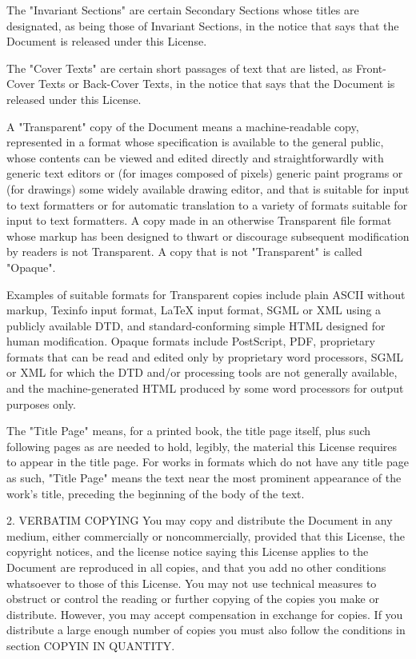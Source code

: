The "Invariant Sections" are certain Secondary Sections whose titles are designated, as being those of Invariant Sections, in the notice that says that the Document is released under this License.

The "Cover Texts" are certain short passages of text that are listed, as Front-Cover Texts or Back-Cover Texts, in the notice that says that the Document is released under this License.

A "Transparent" copy of the Document means a machine-readable copy, represented in a format whose specification is available to the general public, whose contents can be viewed and edited directly and straightforwardly with generic text editors or (for images composed of pixels) generic paint programs or (for drawings) some widely available drawing editor, and that is suitable for input to text formatters or for automatic translation to a variety of formats suitable for input to text formatters. A copy made in an otherwise Transparent file format whose markup has been designed to thwart or discourage subsequent modification by readers is not Transparent. A copy that is not "Transparent" is called "Opaque".

Examples of suitable formats for Transparent copies include plain ASCII without markup, Texinfo input format, LaTeX input format, SGML or XML using a publicly available DTD, and standard-conforming simple HTML designed for human modification. Opaque formats include PostScript, PDF, proprietary formats that can be read and edited only by proprietary word processors, SGML or XML for which the DTD and/or processing tools are not generally available, and the machine-generated HTML produced by some word processors for output purposes only.

The "Title Page" means, for a printed book, the title page itself, plus such following pages as are needed to hold, legibly, the material this License requires to appear in the title page. For works in formats which do not have any title page as such, "Title Page" means the text near the most prominent appearance of the work's title, preceding the beginning of the body of the text.

2. VERBATIM COPYING
You may copy and distribute the Document in any medium, either commercially or noncommercially, provided that this License, the copyright notices, and the license notice saying this License applies to the Document are reproduced in all copies, and that you add no other conditions whatsoever to those of this License. You may not use technical measures to obstruct or control the reading or further copying of the copies you make or distribute. However, you may accept compensation in exchange for copies. If you distribute a large enough number of copies you must also follow the conditions in section COPYIN IN QUANTITY.

